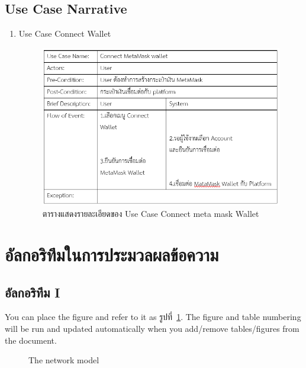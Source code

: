 \documentclass[12pt,oneside,openright,a4paper]{cpe-thai-project}
\begin{document}
\subsection{Use Case Narrative}
\begin{enumerate}[label=.\arabic*,leftmargin=0pt,itemindent=2.5cm]
\item Use Case Connect Wallet
	\begin{figure}[!htb]
		\centering
		\includegraphics[scale=0.8]{connectwallet}
\caption{ตารางแสดงรายละเอียดของ Use Case Connect meta mask Wallet}
	\end{figure}
\end{enumerate}
\section{อัลกอริทึมในการประมวลผลข้อความ}
\subsection{อัลกอริทึม I}

You can place the figure and refer to it as รูปที่~\ref{fig:model2}.
The figure and table numbering will be run and updated automatically when you add/remove tables/figures from the document.

\begin{figure}[!h]\centering
\setlength{\fboxrule}{0.2mm} %
\setlength{\fboxsep}{1cm}
\caption{The network model}\label{fig:model2}
\end{figure}
\end{document}
